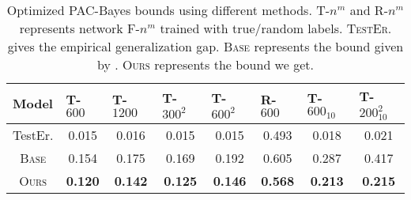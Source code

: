 
\begin{table}[h]
\centering
\caption{Optimized PAC-Bayes bounds using different methods. T-$n^m$ and R-$n^m$ represents network F-$n^m$ trained with true/random labels. \textsc{TestEr.} gives the empirical generalization gap. \textsc{Base} represents the bound given by %
\citet{dziugaite2017computing}. \textsc{Ours} represents the bound we get.} %
\label{tab:pac}
\begin{center}
\begin{small}
\begin{tabular}{cccccccc}
\toprule
\multicolumn{1}{l}{Model} & \multicolumn{1}{l}{T-$600$}     & \multicolumn{1}{l}{T-$1200$}    & \multicolumn{1}{l}{T-$300^2$}   & \multicolumn{1}{l}{T-$600^2$}   & \multicolumn{1}{l}{R-$600$}     & \multicolumn{1}{l}{T-$600_{10}$} & \multicolumn{1}{l}{T-$200_{10}^2$} \\
\midrule
TestEr.   & 0.015  & 0.016  & 0.015  & 0.015  & 0.493  & 0.018   & 0.021     \\
\textsc{Base}      & 0.154  & 0.175  & 0.169  & 0.192  & 0.605  & 0.287   & 0.417     \\
\textsc{Ours}      & \textbf{0.120} & \textbf{0.142} & \textbf{0.125} & \textbf{0.146} & \textbf{0.568}  & \textbf{0.213}  & \textbf{0.215}    \\
\bottomrule
\end{tabular}
\end{small}
\end{center}
\end{table}





